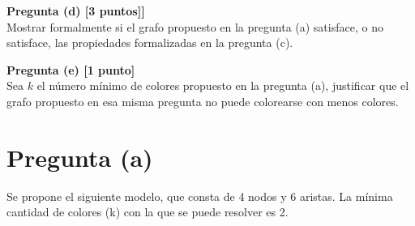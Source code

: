 \documentclass[a4paper,11pt]{article}
\begin{document}
\textbf{Pregunta (d) [3 puntos]]} \\
Mostrar formalmente si el grafo propuesto en la pregunta (a) satisface, o no satisface, las propiedades formalizadas en la pregunta (c).

\textbf{Pregunta (e) [1 punto]} \\
Sea \( k \) el número mínimo de colores propuesto en la pregunta (a), justificar que el grafo propuesto en esa misma pregunta no puede colorearse con menos colores.

\newpage

\section{Pregunta (a)}

Se propone el siguiente modelo, que consta de 4 nodos y 6 aristas. La mínima cantidad de colores (k) con la que se puede resolver es 2.
\end{document}
